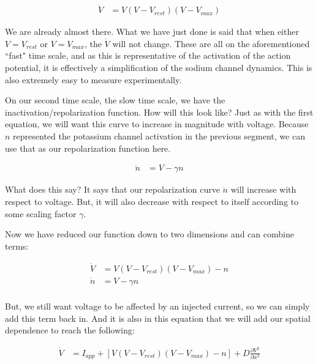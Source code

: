 \begin{equation} \label{fn2}
\begin{split}
\dot{V} &= V(V - V_{rest})(V - V_{max})
\end{split}
\end{equation}

We are already almost there. What we have just done is said that when either $V = V_{rest}$ or $V = V_{max}$, the $\dot{V}$ will not change. These are all on the aforementioned ``fast" time scale, and as this is representative of the activation of the action potential, it is effectively a simplification of the sodium channel dynamics. This is also extremely easy to measure experimentally.\newline

On our second time scale, the slow time scale, we have the inactivation/repolarization function. How will this look like? Just as with the first equation, we will want this curve to increase in magnitude with voltage. Because $n$ represented the potassium channel activation in the previous segment, we can use that as our repolarization function here. 

\begin{equation} \label{fn3}
\begin{split}
\dot{n} &= V - \gamma n
\end{split}
\end{equation}

What does this say? It says that our repolarization curve $\dot{n}$ will increase with respect to voltage. But, it will also decrease with respect to itself according to some scaling factor $\gamma$.\newline

Now we have reduced our function down to two dimensions and can combine terms: 
    
\begin{equation} \label{fn4}
\begin{split}
    \dot{V} &= V(V - V_{rest})(V - V_{max}) - n\\ 
    \dot{n} &= V - \gamma n\\
\end{split}
\end{equation}

But, we still want voltage to be affected by an injected current, so we can simply add this term back in. And it is also in this equation that we will add our spatial dependence to reach the following: 

\begin{equation} \label{fn5}
\begin{split}
    \dot{V} &= I_{app} + [V(V - V_{rest})(V - V_{max}) - n] +  D\frac{\partial V^2}{\partial x^2}\\
\end{split}
\end{equation}


